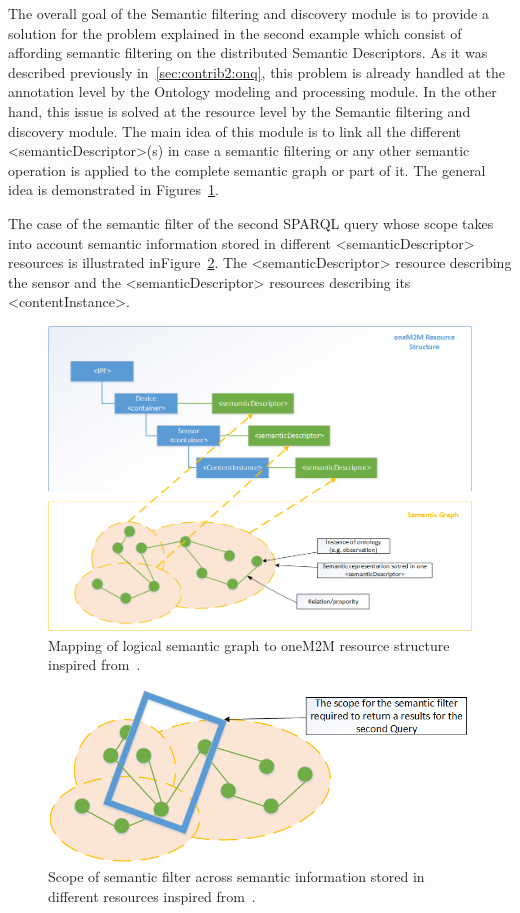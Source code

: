 The overall goal of the Semantic filtering and discovery module is to provide a solution for the problem explained in the second example which consist of affording semantic filtering on the distributed Semantic Descriptors. As it was described previously in~\ref{sec:contrib2:onq}, this problem is already handled at the annotation level by the Ontology modeling and processing module. In the other hand, this issue is solved at the resource level by the Semantic filtering and discovery module. The main idea of this module is to link all the different <semanticDescriptor>(s) in case a semantic filtering or any other semantic operation is applied to the complete semantic graph or part of it. The general idea is demonstrated in Figures~\ref{fig:contrib2:dg}. \par 
The case of the semantic filter of the second SPARQL query whose scope takes into account semantic information stored in different <semanticDescriptor> resources is illustrated inFigure~\ref{fig:contrib2:scope}. The <semanticDescriptor> resource describing the sensor and the <semanticDescriptor> resources describing its <contentInstance>.
\begin{figure}[htbp]
    \centering
    \includegraphics[width=1.\textwidth]{resources/images/dg}
    \caption{Mapping of logical semantic graph to oneM2M resource structure inspired from~\cite{211}. }\label{fig:contrib2:dg}
\end{figure}

\begin{figure}[H]
    \centering
    \includegraphics[width=1\textwidth]{resources/images/scope}
    \caption{Scope of semantic filter across semantic information stored in different resources inspired from~\cite{211}. }\label{fig:contrib2:scope}
\end{figure}

